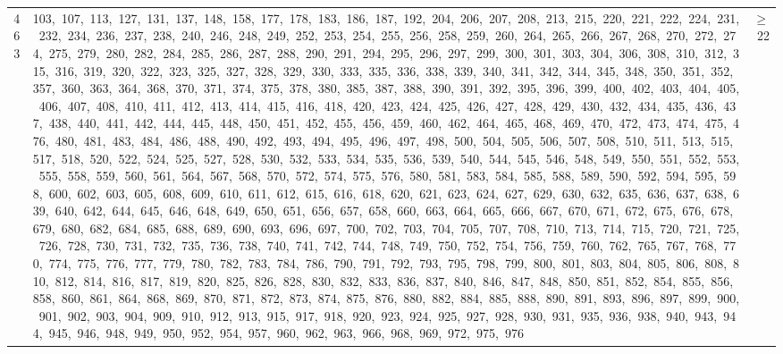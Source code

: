 \begin{longtable}{c|p{}|r}
463 & 103,\ 107,\ 113,\ 127,\ 131,\ 137,\ 148,\ 158,\ 177,\ 178,\ 183,\ 186,\ 187,\ 192,\ 204,\ 206,\ 207,\ 208,\ 213,\ 215,\ 220,\ 221,\ 222,\ 224,\ 231,\ 232,\ 234,\ 236,\ 237,\ 238,\ 240,\ 246,\ 248,\ 249,\ 252,\ 253,\ 254,\ 255,\ 256,\ 258,\ 259,\ 260,\ 264,\ 265,\ 266,\ 267,\ 268,\ 270,\ 272,\ 274,\ 275,\ 279,\ 280,\ 282,\ 284,\ 285,\ 286,\ 287,\ 288,\ 290,\ 291,\ 294,\ 295,\ 296,\ 297,\ 299,\ 300,\ 301,\ 303,\ 304,\ 306,\ 308,\ 310,\ 312,\ 315,\ 316,\ 319,\ 320,\ 322,\ 323,\ 325,\ 327,\ 328,\ 329,\ 330,\ 333,\ 335,\ 336,\ 338,\ 339,\ 340,\ 341,\ 342,\ 344,\ 345,\ 348,\ 350,\ 351,\ 352,\ 357,\ 360,\ 363,\ 364,\ 368,\ 370,\ 371,\ 374,\ 375,\ 378,\ 380,\ 385,\ 387,\ 388,\ 390,\ 391,\ 392,\ 395,\ 396,\ 399,\ 400,\ 402,\ 403,\ 404,\ 405,\ 406,\ 407,\ 408,\ 410,\ 411,\ 412,\ 413,\ 414,\ 415,\ 416,\ 418,\ 420,\ 423,\ 424,\ 425,\ 426,\ 427,\ 428,\ 429,\ 430,\ 432,\ 434,\ 435,\ 436,\ 437,\ 438,\ 440,\ 441,\ 442,\ 444,\ 445,\ 448,\ 450,\ 451,\ 452,\ 455,\ 456,\ 459,\ 460,\ 462,\ 464,\ 465,\ 468,\ 469,\ 470,\ 472,\ 473,\ 474,\ 475,\ 476,\ 480,\ 481,\ 483,\ 484,\ 486,\ 488,\ 490,\ 492,\ 493,\ 494,\ 495,\ 496,\ 497,\ 498,\ 500,\ 504,\ 505,\ 506,\ 507,\ 508,\ 510,\ 511,\ 513,\ 515,\ 517,\ 518,\ 520,\ 522,\ 524,\ 525,\ 527,\ 528,\ 530,\ 532,\ 533,\ 534,\ 535,\ 536,\ 539,\ 540,\ 544,\ 545,\ 546,\ 548,\ 549,\ 550,\ 551,\ 552,\ 553,\ 555,\ 558,\ 559,\ 560,\ 561,\ 564,\ 567,\ 568,\ 570,\ 572,\ 574,\ 575,\ 576,\ 580,\ 581,\ 583,\ 584,\ 585,\ 588,\ 589,\ 590,\ 592,\ 594,\ 595,\ 598,\ 600,\ 602,\ 603,\ 605,\ 608,\ 609,\ 610,\ 611,\ 612,\ 615,\ 616,\ 618,\ 620,\ 621,\ 623,\ 624,\ 627,\ 629,\ 630,\ 632,\ 635,\ 636,\ 637,\ 638,\ 639,\ 640,\ 642,\ 644,\ 645,\ 646,\ 648,\ 649,\ 650,\ 651,\ 656,\ 657,\ 658,\ 660,\ 663,\ 664,\ 665,\ 666,\ 667,\ 670,\ 671,\ 672,\ 675,\ 676,\ 678,\ 679,\ 680,\ 682,\ 684,\ 685,\ 688,\ 689,\ 690,\ 693,\ 696,\ 697,\ 700,\ 702,\ 703,\ 704,\ 705,\ 707,\ 708,\ 710,\ 713,\ 714,\ 715,\ 720,\ 721,\ 725,\ 726,\ 728,\ 730,\ 731,\ 732,\ 735,\ 736,\ 738,\ 740,\ 741,\ 742,\ 744,\ 748,\ 749,\ 750,\ 752,\ 754,\ 756,\ 759,\ 760,\ 762,\ 765,\ 767,\ 768,\ 770,\ 774,\ 775,\ 776,\ 777,\ 779,\ 780,\ 782,\ 783,\ 784,\ 786,\ 790,\ 791,\ 792,\ 793,\ 795,\ 798,\ 799,\ 800,\ 801,\ 803,\ 804,\ 805,\ 806,\ 808,\ 810,\ 812,\ 814,\ 816,\ 817,\ 819,\ 820,\ 825,\ 826,\ 828,\ 830,\ 832,\ 833,\ 836,\ 837,\ 840,\ 846,\ 847,\ 848,\ 850,\ 851,\ 852,\ 854,\ 855,\ 856,\ 858,\ 860,\ 861,\ 864,\ 868,\ 869,\ 870,\ 871,\ 872,\ 873,\ 874,\ 875,\ 876,\ 880,\ 882,\ 884,\ 885,\ 888,\ 890,\ 891,\ 893,\ 896,\ 897,\ 899,\ 900,\ 901,\ 902,\ 903,\ 904,\ 909,\ 910,\ 912,\ 913,\ 915,\ 917,\ 918,\ 920,\ 923,\ 924,\ 925,\ 927,\ 928,\ 930,\ 931,\ 935,\ 936,\ 938,\ 940,\ 943,\ 944,\ 945,\ 946,\ 948,\ 949,\ 950,\ 952,\ 954,\ 957,\ 960,\ 962,\ 963,\ 966,\ 968,\ 969,\ 972,\ 975,\ 976 & $\ge$ 22 \\

\end{longtable}
